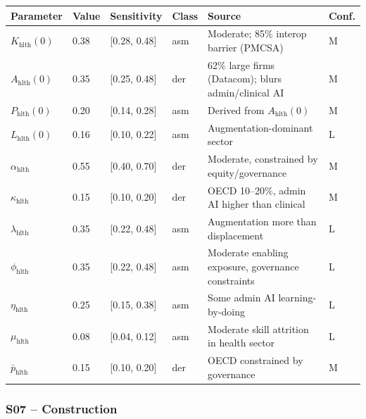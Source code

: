 \documentclass[11pt,a4paper]{article}
\begin{document}
\begin{center}
\begin{tabular}{llllll}
\toprule
Parameter & Value & Sensitivity & Class & Source & Conf.\\
\midrule
$K_{\text{hlth}}(0)$ & 0.38 & [0.28, 0.48] & asm & Moderate; 85\% interop barrier (PMCSA) & M \\
$A_{\text{hlth}}(0)$ & 0.35 & [0.25, 0.48] & der & 62\% large firms (Datacom); blurs admin/clinical AI & M \\
$P_{\text{hlth}}(0)$ & 0.20 & [0.14, 0.28] & asm & Derived from $A_{\text{hlth}}(0)$ & M \\
$L_{\text{hlth}}(0)$ & 0.16 & [0.10, 0.22] & asm & Augmentation-dominant sector & L \\
$\alpha_{\text{hlth}}$ & 0.55 & [0.40, 0.70] & der & Moderate, constrained by equity/governance & M \\
$\kappa_{\text{hlth}}$ & 0.15 & [0.10, 0.20] & der & OECD 10--20\%, admin AI higher than clinical & M \\
$\lambda_{\text{hlth}}$ & 0.35 & [0.22, 0.48] & asm & Augmentation more than displacement & L \\
$\phi_{\text{hlth}}$ & 0.35 & [0.22, 0.48] & asm & Moderate enabling exposure, governance constraints & L \\
$\eta_{\text{hlth}}$ & 0.25 & [0.15, 0.38] & asm & Some admin AI learning-by-doing & L \\
$\mu_{\text{hlth}}$ & 0.08 & [0.04, 0.12] & asm & Moderate skill attrition in health sector & L \\
$\bar{p}_{\text{hlth}}$ & 0.15 & [0.10, 0.20] & der & OECD constrained by governance & M \\
\bottomrule
\end{tabular}
\end{center}

\subsubsection*{S07 -- Construction}
\end{document}
